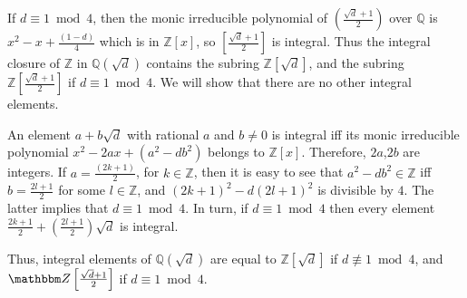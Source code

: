 \documentclass[lec]{subfiles}
\begin{document}
\vspace{0.1cm}

\hspace{0.1cm} If $d\equiv 1 \bmod 4$, then the monic irreducible polynomial of $\left(\frac{\sqrt{d}+1}{2}\right)$ over $\mathbb{Q}$ is $x^2 -x + \frac{(1-d)}{4}$ which is in $\mathbb{Z}[x]$, so $\left[\frac{\sqrt{d}+1}{2}\right]$ is integral. Thus the integral closure of $\mathbb{Z}$ in $\mathbb{Q}(\sqrt{d})$ contains the subring $\mathbb{Z}[\sqrt{d}]$, and the subring $\mathbb{Z}\left[\frac{\sqrt{d}+1}{2}\right]$ if $d\equiv 1 \bmod 4$. We will show that there are no other integral elements.

\vspace{0.2cm}

\hspace{0.2cm} An element $a+b\sqrt{d}$ with rational $a$ and $b\neq0$ is integral iff its monic irreducible polynomial $x^2 -2ax +(a^2 -db^2)$ belongs to $\mathbb{Z}[x]$. Therefore, $2a$,$2b$ are integers. If $a=\frac{(2k+1)}{2}$, for $k\in\mathbb{Z}$, then it is easy to see that $a^2 - db^2 \in \mathbb{Z}$ iff $b=\frac{2l+1}{2}$ for some $l\in\mathbb{Z}$, and $(2k+1)^2 - d(2l+1)^2$ is divisible by $4$. The latter implies that  $d\equiv 1 \bmod 4$. In turn, if $d\equiv 1 \bmod 4$ then every element $\frac{2k+1}{2} +\left(\frac{2l+1}{2}\right)\sqrt{d}$ is integral.

Thus, integral elements of $\mathbb{Q}(\sqrt{d})$ are equal to $\mathbb{Z}[\sqrt{d}]$ if $d\not \equiv 1 \bmod 4$, and $\Z\left[\frac{\sqrt{d}+1}{2}\right]$ if $d\equiv 1 \bmod 4$.
\end{document}
